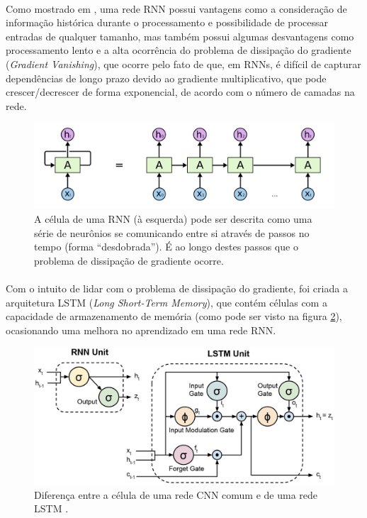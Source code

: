 \documentclass[grad,numbers]{coppe}
\begin{document}
	  	\paragraph{}Como mostrado em \cite{rnn-cheatsheet}, uma rede RNN possui vantagens como a consideração de informação histórica durante o processamento e possibilidade de processar entradas de qualquer tamanho, mas também possui algumas desvantagens como processamento lento e a alta ocorrência do problema de dissipação do gradiente (\textit{Gradient Vanishing}), que ocorre pelo fato de que, em RNNs, é difícil de capturar dependências de longo prazo devido ao gradiente multiplicativo, que pode crescer/decrescer de forma exponencial, de acordo com o número de camadas na rede.
	  	\begin{figure}[h]
	  		\centering
	  		\includegraphics[width=13cm]{rnn-cell.jpg}
	  		\caption{A célula de uma RNN (à esquerda) pode ser descrita como uma série de neurônios se comunicando entre si através de passos no tempo (forma ``desdobrada'')\cite{understanding-lstm}. É ao longo destes passos que o problema de dissipação de gradiente ocorre.}
	  		\label{fig:rnn-cell-fig}
	  	\end{figure}
	  	\paragraph{}Com o intuito de lidar com o problema de dissipação do gradiente, foi criada a arquitetura LSTM (\textit{Long Short-Term Memory})\cite{lstm-paper}, que contém células com a capacidade de armazenamento de memória (como pode ser visto na figura \ref{fig:lstm_rnn_comparisson-fig}), ocasionando uma melhora no aprendizado em uma rede RNN.
	  	\begin{figure}[H]
	  		\centering
	  		\includegraphics[width=12cm]{lstm_rnn_comparisson.jpg}
	  		\caption{Diferença entre a célula de uma rede CNN comum e de uma rede LSTM \cite{lstm-visual}.}
	  		\label{fig:lstm_rnn_comparisson-fig}
	  	\end{figure}
\end{document}
